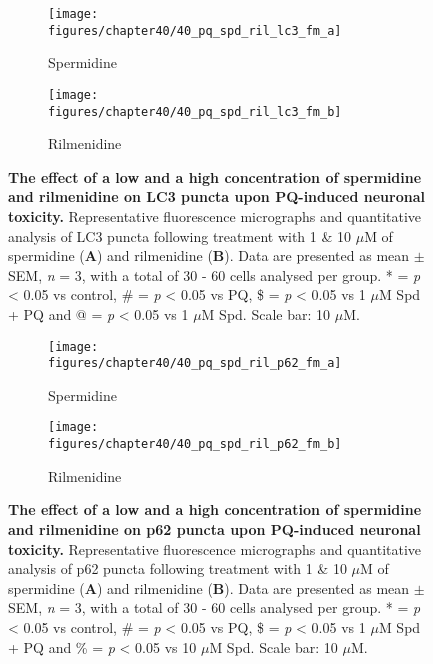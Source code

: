 \begin{figure}[H]
  \center
  \begin{subfigure}[b]{0.495\linewidth}
    \texttt{[image: figures/chapter40/40\_pq\_spd\_ril\_lc3\_fm\_a]}
    \caption{Spermidine}
  \end{subfigure}
  \begin{subfigure}[b]{0.495\linewidth}
    \texttt{[image: figures/chapter40/40\_pq\_spd\_ril\_lc3\_fm\_b]}
    \caption{Rilmenidine}
  \end{subfigure}
  \caption[The effect of a low and a high concentration of spermidine and rilmenidine on LC3 puncta upon PQ-induced neuronal toxicity]{\textbf{The effect of a low and a high concentration of spermidine and rilmenidine on LC3 puncta upon PQ-induced neuronal toxicity.} Representative fluorescence micrographs and quantitative analysis of LC3 puncta following treatment with 1 \& 10 $\mu$M of spermidine (\textbf{A}) and rilmenidine (\textbf{B}). Data are presented as mean $\pm$ SEM, \textit{n} = 3, with a total of 30 - 60 cells analysed per group. * = \textit{p} < 0.05 vs control, \# = \textit{p} < 0.05 vs PQ, \$ = \textit{p} < 0.05 vs 1 $\mu$M Spd + PQ and @ = \textit{p} < 0.05 vs 1 $\mu$M Spd. Scale bar: 10 $\mu$M.}
  \label{fig:40_pq_spd_ril_lc3_fm_a}
\end{figure}

\begin{figure}[H]
  \center
  \begin{subfigure}[b]{0.495\linewidth}
    \texttt{[image: figures/chapter40/40\_pq\_spd\_ril\_p62\_fm\_a]}
    \caption{Spermidine}
  \end{subfigure}
  \begin{subfigure}[b]{0.495\linewidth}
    \texttt{[image: figures/chapter40/40\_pq\_spd\_ril\_p62\_fm\_b]}
    \caption{Rilmenidine}
  \end{subfigure}
  \caption[The effect of a low and a high concentration of spermidine and rilmenidine on p62 puncta upon PQ-induced neuronal toxicity]{\textbf{The effect of a low and a high concentration of spermidine and rilmenidine on p62 puncta upon PQ-induced neuronal toxicity.} Representative fluorescence micrographs and quantitative analysis of p62 puncta following treatment with 1 \& 10 $\mu$M of spermidine (\textbf{A}) and rilmenidine (\textbf{B}). Data are presented as mean $\pm$ SEM, \textit{n} = 3, with a total of 30 - 60 cells analysed per group. * = \textit{p} < 0.05 vs control, \# = \textit{p} < 0.05 vs PQ, \$ = \textit{p} < 0.05 vs 1 $\mu$M Spd + PQ and \% = \textit{p} < 0.05 vs 10 $\mu$M Spd. Scale bar: 10 $\mu$M.}
  \label{fig:40_pq_spd_ril_p62_fm_a}
\end{figure}

